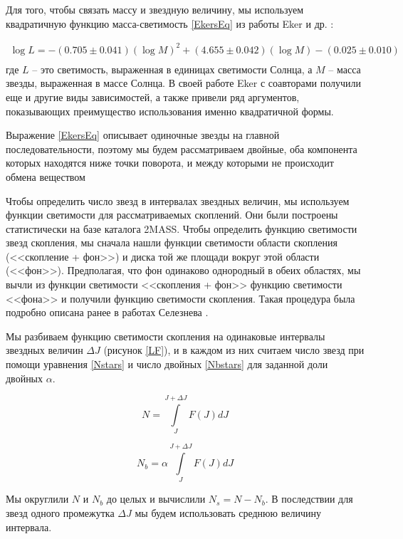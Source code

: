 \documentclass[a4paper,12pt]{article}
\begin{document}
Для того, чтобы связать массу и звездную величину, мы используем квадратичную функцию масса-светимость \ref{EkersEq} из работы Eker и др. \cite{Eker}:

\begin{equation}
\begin{array}{l}
\log{L} = - (0.705 \pm 0.041)(\log{M})^2  + (4.655 \pm 0.042) (\log {M}) - (0.025 \pm 0.010)\\
\label{EkersEq}
\end{array}
\end{equation}
где $L$ -- это светимость, выраженная в единицах светимости Солнца, а $M$  -- масса звезды, выраженная в массе Солнца.
 В своей работе Eker \cite{Eker} с соавторами получили еще и другие виды зависимостей, а также привели ряд аргументов, показывающих преимущество использования именно квадратичной формы.
 
 Выражение \ref{EkersEq} описывает одиночные звезды на главной последовательности, поэтому мы будем рассматриваем двойные, оба компонента которых находятся ниже точки поворота, и между которыми не происходит обмена веществом
 
Чтобы определить число звезд в интервалах звездных величин, мы используем функции светимости для рассматриваемых скоплений. Они были построены статистически на базе каталога 2MASS. Чтобы определить функцию светимости звезд скопления, мы сначала нашли функции светимости области скопления (<<скопление + фон>>) и диска той же площади вокруг этой области (<<фон>>). Предполагая, что фон одинаково однородный в обеих областях, мы вычли из функции светимости <<скопления + фон>> функцию светимости <<фона>> и получили функцию светимости скопления. Такая процедура была подробно описана ранее в работах Селезнева \cite{4337}.

Мы разбиваем функцию светимости скопления на одинаковые интервалы звездных величин $\Delta J$ (рисунок \ref{LF}), и в каждом из них считаем число звезд при помощи уравнения \eqref{Nstars} и число двойных \eqref{Nbstars} для заданной доли двойных $\alpha$.

\begin{equation}
N = \int\limits_J^{J+\Delta J}{F(J)dJ}
\label{Nstars}
\end{equation}

\begin{equation}
N_{b}=\alpha \int\limits_J^{J+\Delta J}{F(J)dJ}
\label{Nbstars}
\end{equation}

Мы округлили $N$ и $N_{b}$ до целых и вычислили $N_{s} = N - N_{b}$. В последствии для звезд одного промежутка $\Delta J$ мы будем использовать среднюю величину интервала.
\end{document}
